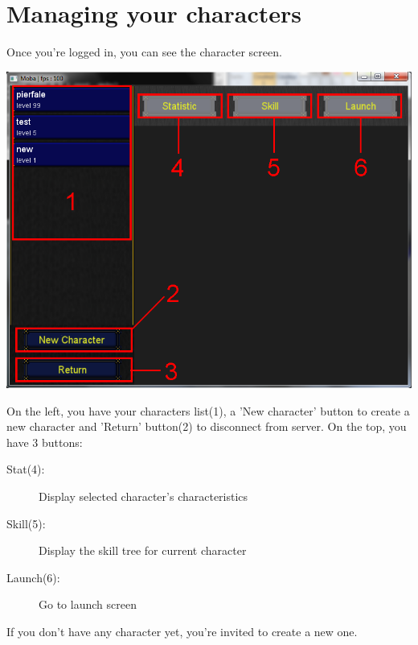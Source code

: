 \documentclass{scrreprt}
\begin{document}
		  \section{Managing your characters}
		  Once you're logged in, you can see the character screen.
		  \begin{center}
		  \includegraphics[scale=0.4]{character_screen.png}
		  \end{center}
		  On the left, you have your characters list(1), a 'New character' button to create a new character and 'Return' button(2) to disconnect from server. On the top, you have 3 buttons:
		  \begin{description}
		  \item[Stat(4):]{Display selected character's characteristics}
		  \item[Skill(5):]{Display the skill tree for current character}
		  \item[Launch(6):]{Go to launch screen}
		  \end{description}
		  If you don't have any character yet, you're invited to create a new one.
\end{document}
